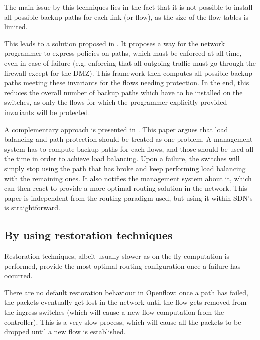 \documentclass[]{IEEEtran}
\begin{document}
The main issue by this techniques lies in the fact that it is not possible to install all possible backup paths for each link (or flow), as the size of the flow tables is limited.

This leads to a solution proposed in \cite{Reitblatt:2013:FDF:2491185.2491187}. It proposes a way for the network programmer to express policies on paths, which must be enforced at all time, even in case of failure (e.g. enforcing that all outgoing traffic must go through the firewall except for the DMZ). This framework then computes all possible backup paths meeting these invariants for the flows needing protection. In the end, this reduces the overall number of backup paths which have to be installed on the switches, as only the flows for which the programmer explicitly provided invariants will be protected.

A complementary approach is presented in \cite{Suchara:2011:NAJ:1993744.1993756}. This paper argues that load balancing and path protection should be treated as one problem. A management system has to compute backup paths for each flows, and those should be used all the time in order to achieve load balancing. Upon a failure, the switches will simply stop using the path that has broke and keep performing load balancing with the remaining ones. It also notifies the management system about it, which can then react to provide a more optimal routing solution in the network. This paper is independent from the routing paradigm used, but using it within SDN's is straightforward.

\subsection{By using restoration techniques}
Restoration techniques, albeit usually slower as on-the-fly computation is performed, provide the most optimal routing configuration once a failure has occurred.

There are no default restoration behaviour in Openflow: once a path has failed, the packets eventually get lost in the network until the flow gets removed from the ingress switches (which will cause a new flow computation from the controller). This is a very slow process, which will cause all the packets to be dropped until a new flow is established.
\end{document}
